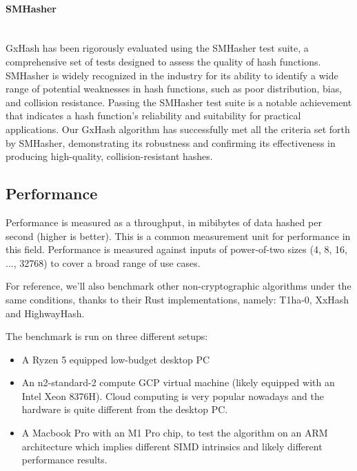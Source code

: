 \documentclass[10pt]{article}
\begin{document}
\paragraph{SMHasher}\leavevmode\\
GxHash has been rigorously evaluated using the SMHasher\cite{smhasher} test suite, a comprehensive set of tests designed to assess the quality of hash functions. SMHasher is widely recognized in the industry for its ability to identify a wide range of potential weaknesses in hash functions, such as poor distribution, bias, and collision resistance. Passing the SMHasher test suite is a notable achievement that indicates a hash function's reliability and suitability for practical applications. Our GxHash algorithm has successfully met all the criteria set forth by SMHasher, demonstrating its robustness and confirming its effectiveness in producing high-quality, collision-resistant hashes. 

\clearpage
\subsection{Performance}

Performance is measured as a throughput, in mibibytes of data hashed per second (higher is better). This is a common measurement unit for performance in this field. Performance is measured against inputs of power-of-two sizes (4, 8, 16, ..., 32768) to cover a broad range of use cases.

For reference, we'll also benchmark other non-cryptographic algorithms under the same conditions, thanks to their Rust implementations, namely: T1ha-0\cite{rust-t1ha}, XxHash\cite{twox-hash} and HighwayHash\cite{highway-rs}.

The benchmark is run on three different setups:
\begin{itemize}
    \item A Ryzen 5 equipped low-budget desktop PC
    \item An n2-standard-2 compute GCP virtual machine (likely equipped with an Intel Xeon 8376H). Cloud computing is very popular nowadays and the hardware is quite different from the desktop PC.
    \item A Macbook Pro with an M1 Pro chip, to test the algorithm on an ARM architecture which implies different SIMD intrinsics and likely different performance results.
\end{itemize}
\end{document}
